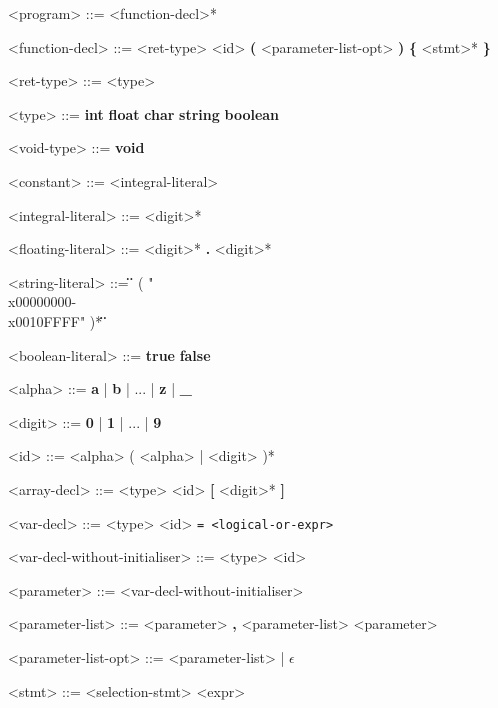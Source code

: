 \documentclass{article}
\begin{document}
        \begin{grammar}
            <program> ::= <function-decl>*

            <function-decl> ::= <ret-type> <id> \textbf{(} <parameter-list-opt> \textbf{)} \textbf{\{} <stmt>* \textbf{\}}

            <ret-type> ::= <type>

            <type> ::= \textbf{int}
            \alt \textbf{float}
            \alt \textbf{char}
            \alt \textbf{string}
            \alt \textbf{boolean}

            <void-type> ::= \textbf{void}

            <constant> ::= <integral-literal>

            <integral-literal> ::= <digit>*

            <floating-literal> ::= <digit>* \textbf{.} <digit>*

            <string-literal> ::= \textbf{\"} ( "\\x00000000-\\x0010FFFF" )*  \textbf{\"}

            <boolean-literal> ::= \textbf{true}
            \alt \textbf{false}

            <alpha> ::= \textbf{a} | \textbf{b} | ... | \textbf{z} | \textbf{_}

            <digit> ::= \textbf{0} | \textbf{1} | ... | \textbf{9}

            <id> ::= <alpha> ( <alpha> | <digit> )*

            <array-decl> ::= <type> <id> \textbf{[} <digit>* \textbf{]}

            <var-decl> ::= <type> <id> \tt{=} <logical-or-expr>

            <var-decl-without-initialiser> ::= <type> <id>

            <parameter> ::= <var-decl-without-initialiser>

            <parameter-list> ::= <parameter> \textbf{,} <parameter-list>
            \alt <parameter>

            <parameter-list-opt> ::= <parameter-list> | $\epsilon$

            <stmt> ::= <selection-stmt>
            \alt <expr>


\end{grammar}
\end{document}
